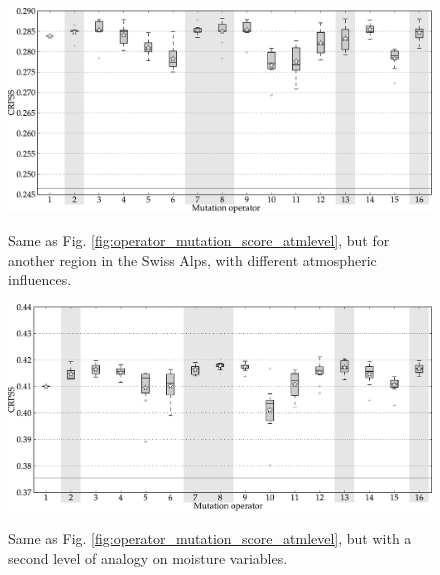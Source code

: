 \documentclass{ametsoc}
\begin{document}
\begin{figure}[t]
	\begin{center}
		\noindent\includegraphics[width=33pc,angle=0]{fig08.pdf}\\
	\end{center}
	\caption{Same as Fig. \ref{fig:operator_mutation_score_atmlevel}, but for another region in the Swiss Alps, with different atmospheric influences.}
	\label{fig:operator_mutation_score_rhoneamont}
\end{figure}

\begin{figure}[t]
	\begin{center}
		\noindent\includegraphics[width=33pc,angle=0]{fig09.pdf}\\
	\end{center}
	\caption{Same as Fig. \ref{fig:operator_mutation_score_atmlevel}, but with a second level of analogy on moisture variables.}
	\label{fig:operator_mutation_score_r2}
\end{figure}
\end{document}
